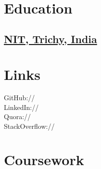 \documentclass[]{deedy-resume-openfont}
\begin{document}
%
%
\lastupdated

%
%



%
%

\begin{minipage}[t]{0.33\textwidth} 


\section{Education} 

\subsection {\href{http://www.nitt.edu/}{NIT, Trichy, India}}


\section{Links} 
GitHub:// \href{https://github.com/tushar-rishav}{} \\
LinkedIn://  \href{https://www.linkedin.com/in/tusharrishav}{} \\
Quora:// \href{https://www.quora.com/profile/Tushar-50}{} \\
StackOverflow:// \href{http://stackoverflow.com/users/3673031/tushar-gautam}{}
\sectionsep


\section{Coursework} 

\end{minipage}
\end{document}
